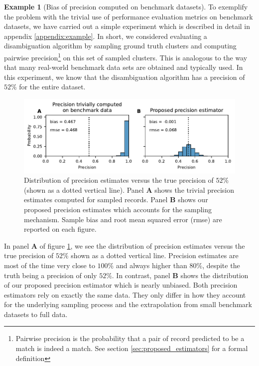 \documentclass[fontsize=11pt]{article}
\theoremstyle{definition}
\newtheorem{example}{Example}
\begin{document}
\begin{example}[Bias of precision computed on benchmark datasets]\label{first_example}
    To exemplify the problem with the trivial use of performance evaluation metrics on benchmark datasets, we have carried out a simple experiment which is described in detail in appendix \ref{appendix:example}. In short, we considered evaluating a disambiguation algorithm by sampling ground truth clusters and computing pairwise precision\footnote{Pairwise precision is the probability that a pair of record predicted to be a match is indeed a match. See section \ref{sec:proposed_estimators} for a formal definition} on this set of sampled clusters. This is analogous to the way that many real-world benchmark data sets are obtained and typically used. In this experiment, we know that the disambiguation algorithm has a precision of $52\%$ for the entire dataset.
    
    \begin{figure}[h]
        \centering
        \includegraphics[width=5.5in]{first-example}
        \caption{Distribution of precision estimates versus the true precision of $52\%$ (shown as a dotted vertical line). Panel \textbf{A} shows the trivial precision estimates computed for sampled records. Panel \textbf{B} shows our proposed precision estimates which accounts for the sampling mechanism. Sample bias and root mean squared error (rmse) are reported on each figure.}
        \label{fig:precision_problem}
    \end{figure}
    
    In panel \textbf{A} of figure \ref{fig:precision_problem}, we see the distribution of precision estimates versus the true precision of $52\%$ shown as a dotted vertical line. Precision estimates are most of the time very close to $100\%$ and always higher than $80\%$, despite the truth being a precision of only $52\%$. In contrast, panel \textbf{B} shows the distribution of our proposed precision estimator which is nearly unbiased. Both precision estimators rely on exactly the same data. They only differ in how they account for the underlying sampling process and the extrapolation from small benchmark datasets to full data.
    
\end{example}
\end{document}
